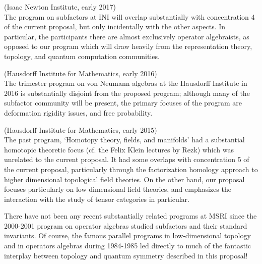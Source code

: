 \documentclass[12pt]{article}
\begin{document}
\begin{description}
  \setlength{\itemsep}{1pt}
  \setlength{\parskip}{0pt}
  \setlength{\parsep}{0pt}
\item[Subfactors and their applications \href{https://www.newton.ac.uk/event/oas}{program}] (Isaac Newton Institute, early 2017) \\
The program on subfactors at INI will overlap substantially with concentration 4 of the current proposal, but only incidentally with
the other aspects. In particular, the participants there are almost exclusively operator algebraists, as opposed to our program which will draw heavily from the representation theory, topology, and quantum computation communities.  
\item[Von Neumann algebras \href{https://www.him.uni-bonn.de/programs/future-programs/future-trimester-programs/von-neumann-algebras-2016/description/}{trimester}] (Hausdorff Institute for Mathematics, early 2016) \\
The trimester program on von Neumann algebras at the Hausdorff Institute in 2016 is substantially disjoint from
the proposed program; although many of the subfactor community will be present, the primary focuses of the program are deformation 
rigidity issues, and free probability.
\item[Homotopy theory, fields, and manifolds \href{https://www.him.uni-bonn.de/programs/past-programs/past-trimester-programs/homotopy-theory-2015/description/}{trimester}] (Hausdorff Institute for Mathematics, early 2015) \\
The past program, `Homotopy theory, fields, and manifolds' had a substantial homotopic theoretic
focus (cf. the Felix Klein lectures by Rezk) which was unrelated to the current proposal. It had some overlaps with concentration 5 of the current proposal, particularly through the factorization homology approach to higher dimensional topological field theories. On the other hand, 
our proposal focuses particularly 
on low dimensional field theories, and emphasizes the interaction with the study of tensor categories in particular.
\end{description}

There have not been any recent substantially related programs at MSRI since the 2000-2001 program on operator algebras studied subfactors and their standard invariants. Of course, the famous parallel programs in low-dimensional topology and in operators algebras during 1984-1985 led directly to much of the fantastic interplay between topology and quantum symmetry described in this proposal!
\end{document}
